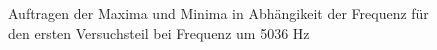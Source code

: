 \documentclass[11pt,a4paper]{article}
\begin{document}
\begin{figure}[p]
\centering
{}
\renewcommand\thefigure{3}
\caption[Auftragen der Maxima und Minima in Abh\"angikeit der Frequenz f\"ur den ersten Versuchsteil bei Frequenz um 5036 Hz]{Auftragen der Maxima und Minima in Abh\"angikeit der Frequenz f\"ur den ersten Versuchsteil bei Frequenz um 5036 Hz}
\label{Abb:4}
\end{figure}
\end{document}
